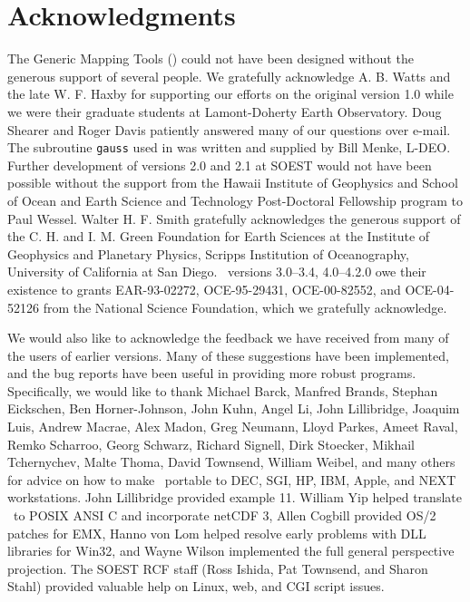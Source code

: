 %
%


\chapter*{Acknowledgments}

The Generic Mapping Tools (\GMT) could not have been designed without
the generous support of several people.  We gratefully acknowledge
A. B. Watts and the late W. F. Haxby for supporting our efforts on the original
version 1.0 while we were their graduate students at Lamont-Doherty
Earth Observatory.  Doug Shearer and Roger Davis patiently answered
many of our questions over e-mail.  The subroutine \texttt{gauss} used in
 was written and supplied by Bill Menke, L-DEO.
Further development of versions 2.0 and 2.1 at SOEST would not have
been possible without the support from the Hawaii Institute of
Geophysics and School of Ocean and Earth Science and Technology
Post-Doctoral Fellowship program to Paul Wessel.  Walter H. F. Smith
gratefully acknowledges the generous support of the C. H. and I. M.
Green Foundation for Earth Sciences at the Institute of Geophysics
and Planetary Physics, Scripps Institution of Oceanography, University
of California at San Diego.
\GMT\ versions 3.0--3.4, 4.0--4.2.0 owe their existence to grants
EAR-93-02272, OCE-95-29431, OCE-00-82552, and OCE-04-52126
from the National Science Foundation, which we gratefully acknowledge.

We would also like to acknowledge the feedback we have received from many
of the users of earlier versions.  Many of these suggestions have
been implemented, and the bug reports have been useful in providing
more robust programs.  Specifically, we would like to thank
Michael Barck,
Manfred Brands,
Stephan Eickschen,
Ben Horner-Johnson,
John Kuhn,
Angel Li,
John Lillibridge,
Joaquim Luis,
Andrew Macrae,
Alex Madon,
Greg Neumann,
Lloyd Parkes,
Ameet Raval,
Remko Scharroo,
Georg Schwarz,
Richard Signell,
Dirk Stoecker,
Mikhail Tchernychev,
Malte Thoma,
David Townsend,
William Weibel,
and many others for
advice on how to make \GMT\ portable to DEC, SGI, HP, IBM, Apple, and
NEXT workstations.  John Lillibridge provided example 11.  William
Yip helped translate \GMT\ to POSIX ANSI C and incorporate netCDF 3, 
Allen Cogbill provided OS/2 patches for EMX, Hanno von Lom helped
resolve early problems with DLL libraries for Win32, and Wayne Wilson
implemented the full general perspective projection.  The SOEST RCF staff
(Ross Ishida, Pat Townsend, and Sharon Stahl) provided valuable help
on Linux, web, and CGI script issues.

